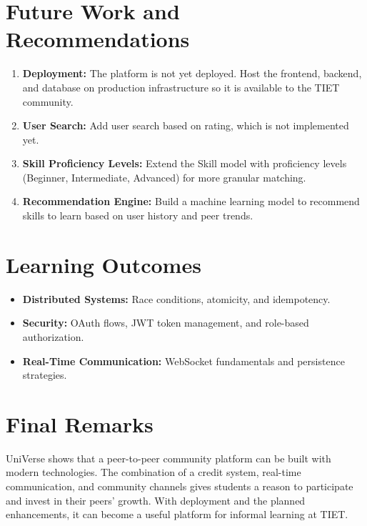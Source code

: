 \documentclass{tietreport}
\begin{document}
\section{Future Work and Recommendations}

\begin{enumerate}
  \item \textbf{Deployment:} The platform is not yet deployed. Host the frontend, backend, and database on production infrastructure so it is available to the TIET community.
  \item \textbf{User Search:} Add user search based on rating, which is not implemented yet.
  \item \textbf{Skill Proficiency Levels:} Extend the Skill model with proficiency levels (Beginner, Intermediate, Advanced) for more granular matching.
  \item \textbf{Recommendation Engine:} Build a machine learning model to recommend skills to learn based on user history and peer trends.
\end{enumerate}

\section{Learning Outcomes}

\begin{itemize}
  \item \textbf{Distributed Systems:} Race conditions, atomicity, and idempotency.
  \item \textbf{Security:} OAuth flows, JWT token management, and role-based authorization.
  \item \textbf{Real-Time Communication:} WebSocket fundamentals and persistence strategies.
\end{itemize}

\section{Final Remarks}

UniVerse shows that a peer-to-peer community platform can be built with modern technologies. The combination of a credit system, real-time communication, and community channels gives students a reason to participate and invest in their peers' growth. With deployment and the planned enhancements, it can become a useful platform for informal learning at TIET.

\nocite{*}
\printbibliography[heading=bibintoc]
\end{document}

